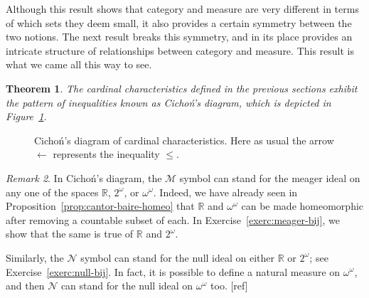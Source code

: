 \documentclass[11pt,oneside]{amsbook}
\newcommand{\RR}{\mathbb R}
\newcommand{\Null}{\mathcal N}
\newcommand{\Meager}{\mathcal M}
\DeclareMathOperator{\add}{\mathsf{add}}
\DeclareMathOperator{\non}{\mathsf{non}}
\DeclareMathOperator{\cov}{\mathsf{cov}}
\DeclareMathOperator{\cof}{\mathsf{cof}}
\theoremstyle{definition}
\theoremstyle{plain}
\newtheorem{thm}{Theorem}[section]
\theoremstyle{definition}
\theoremstyle{remark}
\newtheorem{rem}[thm]{Remark}
\numberwithin{equation}{section}
\numberwithin{figure}{section}
\begin{document}
Although this result shows that category and measure are very different in terms of which sets they deem small, it also provides a certain symmetry between the two notions. The next result breaks this symmetry, and in its place provides an intricate structure of relationships between category and measure. This result is what we came all this way to see.

\begin{thm}
  \label{thm:cichon}
  The cardinal characteristics defined in the previous sections exhibit the pattern of inequalities known as \emph{Cicho\'n's diagram}, which is depicted in Figure~\ref{fig:cichon}.
\end{thm}

\begin{figure}[h]
  \caption{Cicho\'n's diagram of cardinal characteristics. Here as usual the arrow $\leftarrow$ represents the inequality $\leq$.\label{fig:cichon}}
\end{figure}

\begin{rem}
  In Cicho\'n's diagram, the $\Meager$ symbol can stand for the meager ideal on any one of the spaces $\RR$, $2^\omega$, or $\omega^\omega$. Indeed, we have already seen in Proposition~\ref{prop:cantor-baire-homeo} that $\RR$ and $\omega^\omega$ can be made homeomorphic after removing a countable subset of each. In Exercise~\ref{exerc:meager-bij}, we show that the same is true of $\RR$ and $2^\omega$.

  Similarly, the $\Null$ symbol can stand for the null ideal on either $\RR$ or $2^\omega$; see Exercise~\ref{exerc:null-bij}. In fact, it is possible to define a natural measure on $\omega^\omega$, and then $\Null$ can stand for the null ideal on $\omega^\omega$ too. [ref] %
\end{rem}
\end{document}

